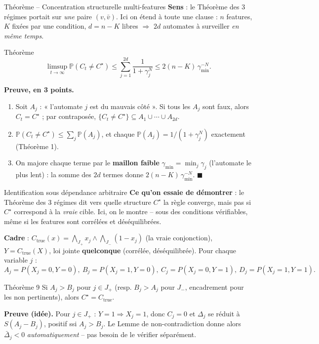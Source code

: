 \documentclass[10pt,aspectratio=169]{beamer}
\begin{document}
\begin{frame}{Théorème -- Concentration structurelle multi-features}
\footnotesize
\textbf{Sens} : le Théorème des 3 régimes portait sur \emph{une} paire
$(v,\bar v)$. Ici on étend à toute une clause : $n$ features, $K$ fixées
par une condition, $d=n-K$ libres $\Rightarrow$ $2d$ automates à surveiller
\emph{en même temps}.

\begin{block}{Théorème}
\footnotesize
\[
  \limsup_{t\to\infty}\mathbb P(C_t\ne C^\star) \le \sum_{j=1}^{2d}\frac1{1+\gamma_j^N}
  \le 2(n-K)\,\gamma_{\min}^{-N}.
\]
\end{block}

\textbf{Preuve, en 3 points.}
\begin{enumerate}
  \item Soit $A_j$ : « l'automate $j$ est du mauvais côté ». Si tous les
  $A_j$ sont faux, alors $C_t=C^\star$ ; par contraposée,
  $\{C_t\ne C^\star\}\subseteq A_1\cup\cdots\cup A_{2d}$.
  \item $\mathbb P(C_t\ne C^\star)\le\sum_j\mathbb P(A_j)$, et
  chaque $\mathbb P(A_j)=1/(1+\gamma_j^N)$ exactement (Théorème 1).
  \item On majore chaque terme par le \textbf{maillon faible}
  $\gamma_{\min}=\min_j\gamma_j$ (l'automate le plus lent) : la somme des
  $2d$ termes donne $2(n-K)\,\gamma_{\min}^{-N}$. $\blacksquare$
\end{enumerate}
\end{frame}

\begin{frame}{Identification sous dépendance arbitraire}
\footnotesize
\textbf{Ce qu'on essaie de démontrer} : le Théorème des 3 régimes dit vers
quelle structure $C^\star$ la règle converge, mais pas si $C^\star$
correspond à la \emph{vraie} cible. Ici, on le montre -- sous des
conditions vérifiables, même si les features sont corrélées et
déséquilibrées.

\vspace{1mm}
\textbf{Cadre} : $C_{\mathrm{true}}(x)=\bigwedge_{J_+}x_j\wedge\bigwedge_{J_-}(1{-}x_j)$
(la vraie conjonction), $Y=C_{\mathrm{true}}(X)$, loi jointe
\textbf{quelconque} (corrélée, déséquilibrée). Pour chaque variable $j$ :
\[
  A_j{=}P(X_j{=}0,Y{=}0),\ B_j{=}P(X_j{=}1,Y{=}0),\ C_j{=}P(X_j{=}0,Y{=}1),\ D_j{=}P(X_j{=}1,Y{=}1).
\]

\begin{block}{Théorème 9}
\footnotesize
Si $A_j>B_j$ pour $j\in J_+$ (resp. $B_j>A_j$ pour $J_-$, encadrement pour
les non pertinents), alors $C^\star=C_{\mathrm{true}}$.
\end{block}

\textbf{Preuve (idée).} Pour $j\in J_+$ : $Y{=}1\Rightarrow X_j{=}1$, donc
$C_j=0$ et $\Delta_j$ se réduit à $S(A_j-B_j)$, positif ssi $A_j>B_j$. Le
Lemme de non-contradiction donne alors $\bar\Delta_j<0$
\emph{automatiquement} -- pas besoin de le vérifier séparément.
\end{frame}
\end{document}
